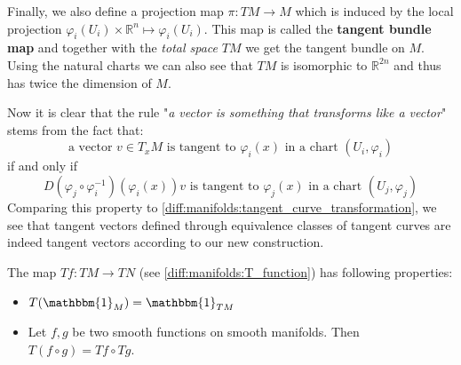 \begin{construct}
		Finally, we also define a projection map $\pi:TM\rightarrow M$ which is induced by the local projection $\varphi_i(U_i)\times\mathbb{R}^n\mapsto\varphi_i(U_i)$. This map is called the \textbf{tangent bundle map} and together with the \textit{total space} $TM$ we get the tangent bundle on $M$. Using the natural charts we can also see that $TM$ is isomorphic to $\mathbb{R}^{2n}$ and thus has twice the dimension of $M$.
	\end{construct}
	
	\begin{remark}
		Now it is clear that the rule "\textit{a vector is something that transforms like a vector}" stems from the fact that:
		\[\text{a vector }v\in T_xM\text{ is tangent to }\varphi_i(x)\text{ in a chart }(U_i, \varphi_i)\]
		if and only if
		\[D(\varphi_j\circ\varphi_i^{-1})(\varphi_i(x))v\text{ is tangent to }\varphi_j(x)\text{ in a chart }(U_j, \varphi_j)\]
		Comparing this property to \ref{diff:manifolds:tangent_curve_transformation}, we see that tangent vectors defined through equivalence classes of tangent curves are indeed tangent vectors according to our new construction.
	\end{remark}
	
	
	\begin{property}
		The map $Tf: TM\rightarrow TN$ (see \ref{diff:manifolds:T_function}) has following properties\footnotemark:
		\begin{itemize}
			\item $T(\mathbbm{1}_M) = \mathbbm{1}_{TM}$
			\item Let $f, g$ be two smooth functions on smooth manifolds. Then $T(f\circ g) = Tf\circ Tg$.
		\end{itemize}
	\end{property}
	
